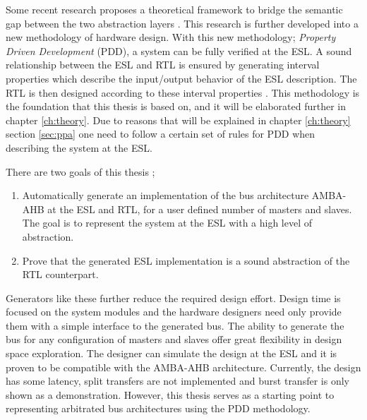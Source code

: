 Some recent research proposes a theoretical framework to bridge the semantic gap between the two abstraction layers \cite{2014-UrdahlStoffel.etal}. This research is further developed into a new methodology of hardware design. With this new methodology; \textit{Property Driven Development} (PDD), a system can be fully verified at the ESL. A sound relationship between the ESL and RTL is ensured by generating interval properties which describe the input/output behavior of the ESL description. The RTL is then designed according to these interval properties \cite{pddref}. This methodology is the foundation that this thesis is based on, and it will be elaborated further in chapter \ref{ch:theory}. Due to reasons that will be explained in chapter \ref{ch:theory} section \ref{sec:ppa} one need to follow a certain set of rules for PDD when describing the system at the ESL. \par 
There are two goals of this thesis ; \\
\begin{enumerate}
 \item Automatically generate an implementation of the bus architecture AMBA-AHB at the ESL and RTL, for a user defined number of masters and slaves. The goal
is to represent the system at the ESL with a high level of abstraction.
 \item Prove that the generated ESL implementation is a sound abstraction of the RTL counterpart.
\end{enumerate}

Generators like these further reduce the required design effort. Design time is focused on the system modules and the hardware designers need only provide them with a simple interface to the generated bus. The ability to generate the bus for any configuration of masters and slaves offer great flexibility in design space exploration. The designer can simulate the design at the ESL and it is proven to be compatible with the AMBA-AHB architecture. Currently, the design has some latency, split transfers are not implemented and burst transfer is only shown as a demonstration. However, this thesis serves as a starting point to representing arbitrated bus architectures using the PDD methodology.   


 


